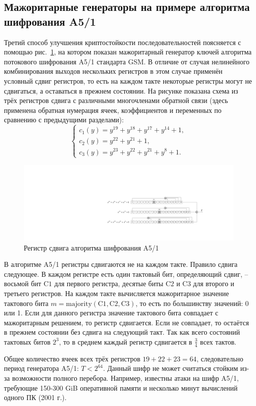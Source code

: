 \subsection[Мажоритарные генераторы, шифр A5/1]{Мажоритарные генераторы на примере алгоритма шифрования A5/1}\label{section:majority_generators}

Третий способ улучшения криптостойкости последовательностей поясняется с помощью рис.~\ref{fig:gsm-a51-cipher}, на котором показан мажоритарный генератор ключей алгоритма потокового шифрования A5/1 стандарта GSM. В отличие от случая нелинейного комбинирования выходов нескольких регистров в этом случае применён условный сдвиг регистров, то есть на каждом такте некоторые регистры могут не сдвигаться, а оставаться в прежнем состоянии. На рисунке показана схема из трёх регистров сдвига с различными многочленами обратной связи (здесь применена обратная нумерация ячеек, коэффициентов и переменных по сравнению с предыдущими разделами):
\[ \left\{ \begin{array}{l}
    c_1(y) = y^{19} + y^{18} + y^{17} + y^{14} + 1, \\
    c_2(y) = y^{22} + y^{21} + 1, \\
    c_3(y) = y^{23} + y^{22} + y^{21} + y^8 + 1.
\end{array} \right. \]

\begin{figure}[!ht]
    \centering
	\includegraphics[width=\textwidth]{pic/gsm-a51-cipher}
    \caption{Регистр сдвига алгоритма шифрования A5/1\label{fig:gsm-a51-cipher}}
\end{figure}

В алгоритме A5/1 регистры сдвигаются не на каждом такте. Правило сдвига следующее. В каждом регистре есть один тактовый бит, определяющий сдвиг, -- восьмой бит $\textrm{C1}$ для первого регистра, десятые биты $\textrm{C2}$ и $\textrm{C3}$ для второго и третьего регистров. На каждом такте вычисляется мажоритарное значение тактового бита $m = \textrm{majority}(\textrm{C1}, \textrm{C2}, \textrm{C3})$, то есть по большинству значений: 0 или 1. Если для данного регистра значение тактового бита совпадает с мажоритарным решением, то регистр сдвигается. Если не совпадает, то остаётся в прежнем состоянии без сдвига на следующий такт. Так как всего состояний тактовых битов $2^3$, то в среднем каждый регистр сдвигается в $\frac{3}{4}$ всех тактов.

Общее количество ячеек всех трёх регистров $19+22+23=64$, следовательно период генератора A5/1: $T < 2^{64}$. Данный шифр не может считаться стойким из-за возможности полного перебора. Например, известны атаки на шифр A5/1, требующие 150-300 GiB оперативной памяти и несколько минут вычислений одного ПК (2001 г.).
